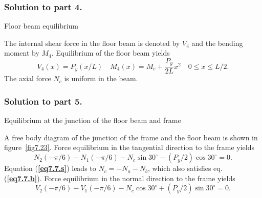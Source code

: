 \documentclass{AeroStructure-ERJohnson}
\begin{document}
\begin{example}
\vspace*{-10pt}

\subsubsection{Solution to part 4.} Floor beam equilibrium

The internal shear force in the floor beam is denoted by $V_4$ and the bending moment by $M_4$. Equilibrium of the floor beam yields
\begin{equation}
V_4 (x)=P_y(x/L)\quad M_4(x)=M_c+\frac{P_y}{2L}x^{2}\quad 0\leq x \leq L/2. \label{eq7.7.r}\tag{r}
\end{equation}
The axial force $\textit{N}_{{c}}$ is uniform in the beam.



\subsubsection{Solution to part 5.} Equilibrium at the junction of the floor beam and frame

A free body diagram of the junction of the frame and the floor beam is shown in figure~\ref{fig7.23}. Force equilibrium in the tangential direction to the frame yields
{\def\thefigure{7.23}
}
\begin{equation}
N_{2}(-\pi / 6)-N_{1}(-\pi / 6)-N_{c} \sin 30^{\circ}-\left(P_{y} / 2\right) \cos 30^{\circ}=0. \label{eq7.7.s}\tag{s}
\end{equation}
Equation (\textbf{\ref{eq7.7.s}}) leads to $N_{c}=-N_{a}-N_{b}$, which also satisfies eq. (\textbf{\ref{eq7.7.b}}). Force equilibrium in the normal direction to the frame yields
\begin{equation}
V_{2}(-\pi / 6)-V_{1}(-\pi / 6)-N_{c} \cos 30^{\circ}+\left(P_{y} / 2\right) \sin 30^{\circ}=0. \label{eq7.7.t}\tag{t}
\end{equation}


\end{example}
\end{document}
